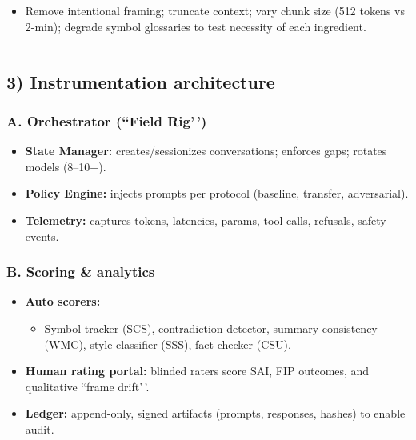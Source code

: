 \documentclass{article}
\begin{document}
\begin{enumerate}
  \begin{itemize}
  \tightlist
  \item
    Remove intentional framing; truncate context; vary chunk size (512 tokens vs 2-min); degrade symbol glossaries to test necessity of each ingredient.
  \end{itemize}
\end{enumerate}

\begin{center}\rule{0.5\linewidth}{0.5pt}\end{center}

\subsection*{3) Instrumentation architecture}\label{instrumentation-architecture}

\subsubsection*{A. Orchestrator (``Field Rig'\,')}\label{a.-orchestrator-field-rig}

\begin{itemize}
\item
  \textbf{State Manager:} creates/sessionizes conversations; enforces gaps; rotates models (8--10+).
\item
  \textbf{Policy Engine:} injects prompts per protocol (baseline, transfer, adversarial).
\item
  \textbf{Telemetry:} captures tokens, latencies, params, tool calls, refusals, safety events.
\end{itemize}

\subsubsection*{B. Scoring \& analytics}\label{b.-scoring-analytics}

\begin{itemize}
\item
  \textbf{Auto scorers:}

  \begin{itemize}
  \tightlist
  \item
    Symbol tracker (SCS), contradiction detector, summary consistency (WMC), style classifier (SSS), fact-checker (CSU).
  \end{itemize}
\item
  \textbf{Human rating portal:} blinded raters score SAI, FIP outcomes, and qualitative ``frame drift'\,'.
\item
  \textbf{Ledger:} append-only, signed artifacts (prompts, responses, hashes) to enable audit.
\end{itemize}
\end{document}
